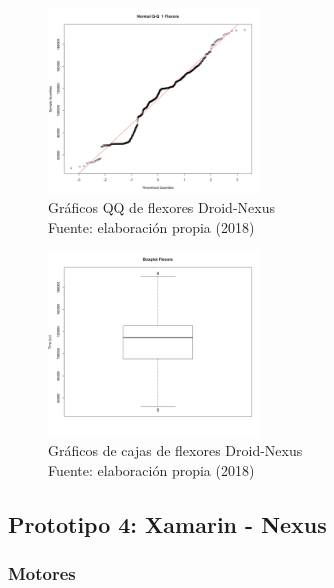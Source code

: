 \begin{figure}[H]
  \begin{center} 
   	\includegraphics[width=0.5\textwidth]{evaluation/graphics/Droid/Nexus/NormalQQFlexorsDroidNexus.png} 
    \caption[Gráfico QQ de flexores Droid-Nexus]{Gráficos QQ de flexores Droid-Nexus\\Fuente: elaboración propia (2018)} 
    \label{fig:droid-nexus-QQ-flexors}
  \end{center}
\end{figure}

\begin{figure}[H]
  \begin{center} 
   	\includegraphics[width=0.5\textwidth]{evaluation/graphics/Droid/Nexus/BoxplotFlexorsDroidNexus.png} 
    \caption[Gráficos de cajas de flexores Droid-Nexus]{Gráficos de cajas de flexores Droid-Nexus\\Fuente: elaboración propia (2018)} 
    \label{fig:droid-nexus-boxplot-flexors}
  \end{center}
\end{figure}

\subsection{Prototipo 4: Xamarin - Nexus}

\subsubsection{Motores}

